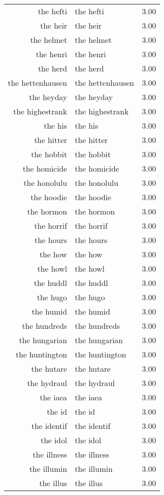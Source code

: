 \begin{table}[ht]
\begin{tabular}{rlr}
  the hefti & the hefti & 3.00 \\ 
  the heir & the heir & 3.00 \\ 
  the helmet & the helmet & 3.00 \\ 
  the henri & the henri & 3.00 \\ 
  the herd & the herd & 3.00 \\ 
  the hettenhausen & the hettenhausen & 3.00 \\ 
  the heyday & the heyday & 3.00 \\ 
  the highestrank & the highestrank & 3.00 \\ 
  the his & the his & 3.00 \\ 
  the hitter & the hitter & 3.00 \\ 
  the hobbit & the hobbit & 3.00 \\ 
  the homicide & the homicide & 3.00 \\ 
  the honolulu & the honolulu & 3.00 \\ 
  the hoodie & the hoodie & 3.00 \\ 
  the hormon & the hormon & 3.00 \\ 
  the horrif & the horrif & 3.00 \\ 
  the hours & the hours & 3.00 \\ 
  the how & the how & 3.00 \\ 
  the howl & the howl & 3.00 \\ 
  the huddl & the huddl & 3.00 \\ 
  the hugo & the hugo & 3.00 \\ 
  the humid & the humid & 3.00 \\ 
  the hundreds & the hundreds & 3.00 \\ 
  the hungarian & the hungarian & 3.00 \\ 
  the huntington & the huntington & 3.00 \\ 
  the hutare & the hutare & 3.00 \\ 
  the hydraul & the hydraul & 3.00 \\ 
  the iaea & the iaea & 3.00 \\ 
  the id & the id & 3.00 \\ 
  the identif & the identif & 3.00 \\ 
  the idol & the idol & 3.00 \\ 
  the illness & the illness & 3.00 \\ 
  the illumin & the illumin & 3.00 \\ 
  the illus & the illus & 3.00 \\ 

\end{tabular}
\end{table}
